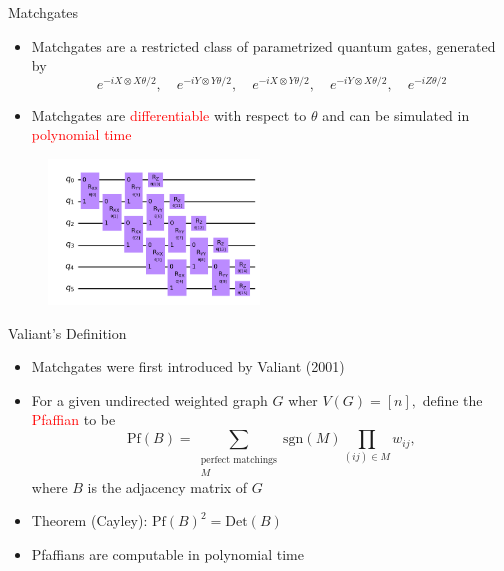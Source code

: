 \documentclass[xcolor=dvipsnames]{beamer}
\begin{document}
\begin{frame}{Matchgates}
  \begin{itemize}
    \item Matchgates are a restricted class of parametrized quantum gates, generated by 
    $$e^{-iX\otimes X\theta/2},\quad e^{-iY\otimes Y\theta/2},\quad e^{-iX\otimes Y\theta/2},\quad e^{-iY\otimes X\theta/2},\quad e^{-iZ\theta/2}$$
    \item Matchgates are \textcolor{red}{differentiable} with respect to $\theta$ and can be simulated in \textcolor{red}{polynomial time} 
  \end{itemize}

  \begin{figure}
    \centering
    \includegraphics[width=0.5\textwidth]{output.png}
  \end{figure}

\end{frame}

\begin{frame}{Valiant's Definition}
  \begin{itemize}
    \item Matchgates were first introduced by Valiant (2001)
    \item For a given undirected weighted graph $G$ wher $V(G)=[n],$ define the \textcolor{red}{Pfaffian} to be
    \[\text{Pf}(B)=\sum_{\substack{\text{perfect matchings} \\ M}}\text{sgn}(M)\prod_{(ij)\in M}w_{ij},\]
    where $B$ is the adjacency matrix of $G$
    \item Theorem (Cayley): $\text{Pf}(B)^2=\text{Det}(B)$
    \item Pfaffians are computable in polynomial time
  \end{itemize}
\end{frame}
\end{document}
